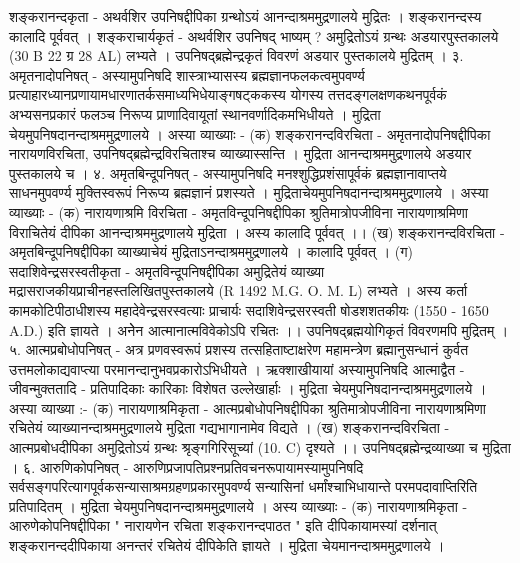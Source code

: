 शङ्करानन्दकृता - अथर्वशिर उपनिषद्दीपिका   
ग्रन्थोऽयं आनन्दाश्रममुद्रणालये मुद्रितः । शङ्करानन्दस्य कालादि पूर्ववत् । 
शङ्कराचार्यकृतं - अथर्वशिर उपनिषद् भाष्यम् ?
अमुद्रितोऽयं ग्रन्थः अडयारपुस्तकालये (30 B 22 ग्र 28 AL) लभ्यते । उपनिषद्ब्रह्मेन्द्रकृतं विवरणं अडयार पुस्तकालये मुद्रितम् । 
३. अमृतनादोपनिषत् - 
अस्यामुपनिषदि शास्त्राभ्यासस्य ब्रह्मज्ञानफलकत्वमुपवर्ण्य प्रत्याहारध्यानप्रणायामधारणातर्कसमाध्यभिधेयाङ्गषट्ककस्य योगस्य तत्तदङ्गलक्षणकथनपूर्वकं अभ्यसनप्रकारं फलञ्च निरूप्य प्राणादिवायूतां स्थानवर्णादिकमभिधीयते । मुद्रिता चेयमुपनिषदानन्दाश्रममुद्रणालये । अस्या व्याख्याः - 
(क) शङ्करानन्दविरचिता - अमृतनादोपनिषद्दीपिका 
नारायणविरचिता, उपनिषद्ब्रह्मेन्द्रविरचिताश्च व्याख्यास्सन्ति । मुद्रिता आनन्दाश्रममुद्रणालये अडयार पुस्तकालये च । 
४. अमृतबिन्दूपनिषत् -
अस्यामुपनिषदि मनश्शुद्धिप्रशंसापूर्वकं ब्रह्मज्ञानावाप्तये साधनमुपवर्ण्य मुक्तिस्वरूपं निरूप्य ब्रह्मज्ञानं प्रशस्यते । मुद्रिताचेयमुपनिषदानन्दाश्रममुद्रणालये । अस्या व्याख्याः - 
(क) नारायणाश्रमि विरचिता - अमृतविन्दूपनिषद्दीपिका 
श्रुतिमात्रोपजीविना नारायणाश्रमिणा विराचितेयं दीपिका आनन्दाश्रममुद्रणालये मुद्रिता । अस्य कालादि पूर्ववत् ।। 
(ख) शङ्करानन्दविरचिता - अमृतबिन्दूपनिषद्दीपिका 
व्याख्याचेयं मुद्रिताऽनन्दाश्रममुद्रणालये । कालादि पूर्ववत् । 
(ग) सदाशिवेन्द्रसरस्वतीकृता - अमृतविन्दूपनिषद्दीपिका 
अमुद्रितेयं व्याख्या मद्रासराजकीयप्राचीनहस्तलिखितपुस्तकालये (R 1492 M.G. O. M. L) लभ्यते । अस्य कर्ता कामकोटिपीठाधीशस्य महादेवेन्द्रसरस्वत्याः प्राचार्यः सदाशिवेन्द्रसरस्वती षोडशशतकीयः (1550 - 1650 A.D.) इति ज्ञायते । अनेेन आत्मानात्मविवेकोऽपि रचितः ।। उपनिषद्ब्रह्मयोगिकृतं विवरणमपि मुद्रितम् । 
५. आत्मप्रबोधोपनिषत् - 
अत्र प्रणवस्वरूपं प्रशस्य तत्सहिताष्टाक्षरेण महामन्त्रेण ब्रह्मानुसन्धानं कुर्वत उत्तमलोकाद्यवाप्त्या परमानन्दानुभवप्रकारोऽभिधीयते । ऋक्शाखीयायां अस्यामुपनिषदि आत्माद्वैत - जीवन्मुक्ततादि - प्रतिपादिकाः कारिकाः विशेषत उल्लेखार्हाः । मुद्रिता चेयमुपनिषदानन्दाश्रममुद्रणालये । अस्या व्याख्या :-
(क) नारायणाश्रमिकृता - आत्मप्रबोधोपनिषद्दीपिका 
श्रुतिमात्रोपजीविना नारायणाश्रमिणा रचितेयं व्याख्यानन्दाश्रममुद्रणालये मुद्रिता गद्यभागानामेव विद्यते । 
(ख) शङ्करानन्दविरचिता - आत्मप्रबोधदीपिका 
अमुद्रितोऽयं ग्रन्थः श्रृङ्गगिरिसूच्यां (10. C) दृश्यते ।। उपनिषद्ब्रह्मेन्द्रव्याख्या च मुद्रिता ।
६. आरुणिकोपनिषत् - 
आरुणिप्रजापतिप्रश्नप्रतिवचनरूपायामस्यामुपनिषदि सर्वसङ्गपरित्यागपूर्वकसन्यासाश्रमग्रहणप्रकारमुपवर्ण्य सन्यासिनां धर्मांश्चाभिधायान्ते परमपदावाप्तिरिति प्रतिपादितम् । मुद्रिता चेयमुपनिषदानन्दाश्रममुद्रणालये । अस्य व्याख्याः -
(क) नारायणाश्रमिकृता - आरुणेकोपनिषद्दीपिका 
" नारायणेन रचिता शङ्करानन्दपाठत " इति दीपिकायामस्यां दर्शनात् शङ्करानन्ददीपिकाया अनन्तरं रचितेयं दीपिकेति ज्ञायते । मुद्रिता चेयमानन्दाश्रममुद्रणालये । 
